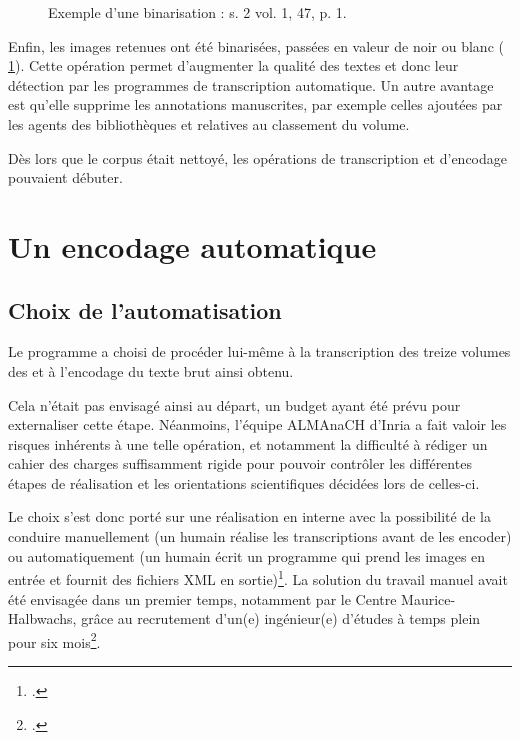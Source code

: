 \begin{figure}[ht]
\begin{subfigure}[t]{0.4\textwidth}
    \end{subfigure}
    \caption[Exemple d'une binarisation]{Exemple d'une binarisation : s. 2 vol. 1, \no{} 47, p. 1.}
    \label{fig:binarisation}
\end{figure}

Enfin, les images retenues ont été binarisées, \cad{} passées en valeur de noir ou blanc (\fig{} \ref{fig:binarisation}). Cette opération permet d'augmenter la qualité des textes et donc leur détection par les programmes de transcription automatique. Un autre avantage est qu'elle supprime les annotations manuscrites, par exemple celles ajoutées par les agents des bibliothèques et relatives au classement du volume.

Dès lors que le corpus était nettoyé, les opérations de transcription et d'encodage pouvaient débuter.

\newpage
\thispagestyle{empty}
\mbox{}
\newpage

\chapter{Un encodage automatique}

\section{Choix de l'automatisation}
Le programme \timeus{} a choisi de procéder lui-même à la transcription des treize volumes des \odm{} et à l'encodage du texte brut ainsi obtenu. 

Cela n'était pas envisagé ainsi au départ, un budget ayant été prévu pour externaliser cette étape. Néanmoins, l'équipe ALMAnaCH d'Inria a fait valoir les risques inhérents à une telle opération, et notamment la difficulté à rédiger un cahier des charges suffisamment rigide pour pouvoir contrôler les différentes étapes de réalisation et les orientations scientifiques décidées lors de celles-ci.

Le choix s'est donc porté sur une réalisation en interne avec la possibilité de la conduire manuellement (un humain réalise les transcriptions avant de les encoder) ou automatiquement (un humain écrit un programme qui prend les images en entrée et fournit des fichiers XML en sortie)\footcite[p. 52]{chague}. La solution du travail manuel avait été envisagée dans un premier temps, notamment par le Centre Maurice-Halbwachs, grâce au recrutement d'un(e) ingénieur(e) d'études à temps plein pour six mois\footcite[p. 52]{chague}. 

